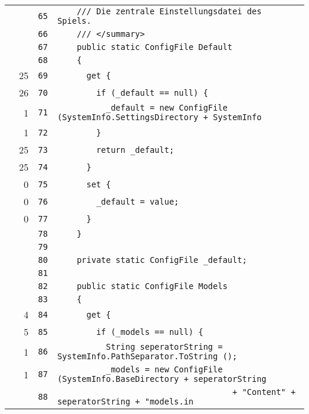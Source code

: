 \documentclass[a4paper,10pt]{article}
\begin{document}
\begin{longtable}[l]{lrrl}
\cellcolor{gray} &  & \verb~65~ & \verb~    /// Die zentrale Einstellungsdatei des Spiels.~\\
\cellcolor{gray} &  & \verb~66~ & \verb~    /// </summary>~\\
\cellcolor{gray} &  & \verb~67~ & \verb~    public static ConfigFile Default~\\
\cellcolor{gray} &  & \verb~68~ & \verb~    {~\\
\cellcolor{green} & 25 & \verb~69~ & \verb~      get {~\\
\cellcolor{green} & 26 & \verb~70~ & \verb~        if (_default == null) {~\\
\cellcolor{green} & 1 & \verb~71~ & \verb~          _default = new ConfigFile (SystemInfo.SettingsDirectory + SystemInfo~\\
\cellcolor{green} & 1 & \verb~72~ & \verb~        }~\\
\cellcolor{green} & 25 & \verb~73~ & \verb~        return _default;~\\
\cellcolor{green} & 25 & \verb~74~ & \verb~      }~\\
\cellcolor{red} & 0 & \verb~75~ & \verb~      set {~\\
\cellcolor{red} & 0 & \verb~76~ & \verb~        _default = value;~\\
\cellcolor{red} & 0 & \verb~77~ & \verb~      }~\\
\cellcolor{gray} &  & \verb~78~ & \verb~    }~\\
\cellcolor{gray} &  & \verb~79~ & \verb~~\\
\cellcolor{gray} &  & \verb~80~ & \verb~    private static ConfigFile _default;~\\
\cellcolor{gray} &  & \verb~81~ & \verb~~\\
\cellcolor{gray} &  & \verb~82~ & \verb~    public static ConfigFile Models~\\
\cellcolor{gray} &  & \verb~83~ & \verb~    {~\\
\cellcolor{green} & 4 & \verb~84~ & \verb~      get {~\\
\cellcolor{green} & 5 & \verb~85~ & \verb~        if (_models == null) {~\\
\cellcolor{green} & 1 & \verb~86~ & \verb~          String seperatorString = SystemInfo.PathSeparator.ToString ();~\\
\cellcolor{green} & 1 & \verb~87~ & \verb~          _models = new ConfigFile (SystemInfo.BaseDirectory + seperatorString~\\
\cellcolor{gray} &  & \verb~88~ & \verb~                                    + "Content" + seperatorString + "models.in~\\

\end{longtable}
\end{document}
